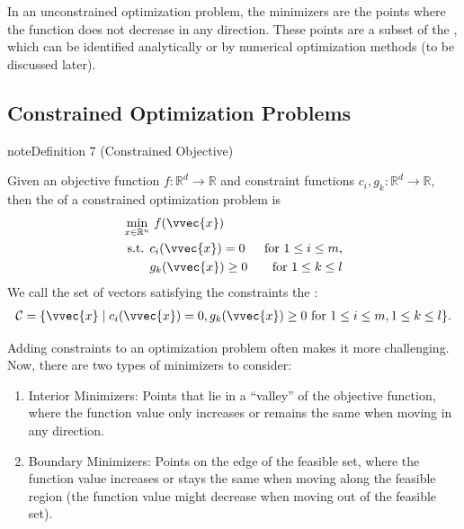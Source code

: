 \documentclass[letterpaper,10pt,english]{jupyterBook}
\begin{document}
\sphinxAtStartPar
In an unconstrained optimization problem, the minimizers are the points where the function does not decrease in any direction. These points are a subset of the , which can be identified analytically or by numerical optimization methods (to be discussed later).


\subsection{Constrained Optimization Problems}
\label{\detokenize{optimization_problems:constrained-optimization-problems}}\label{optimization_problems:constr_objective}
\begin{sphinxadmonition}{note}{Definition 7 (Constrained Objective)}



\sphinxAtStartPar
Given an objective function \(f:\mathbb{R}^d\rightarrow \mathbb{R}\) and constraint functions \(c_i,g_k:\mathbb{R}^d\rightarrow \mathbb{R}\), then  the  of a constrained optimization problem is
\begin{align*}
    \min_{x\in\mathbb{R}^n}&\ f(\vvec{x}) \\
    \text{s.t. }& c_i(\vvec{x}) =0  &\text{ for } 1\leq i \leq m,\\
                & g_k(\vvec{x})\geq 0 &\text{ for }1\leq k\leq l
\end{align*}
\sphinxAtStartPar
We call the set of vectors satisfying the constraints the :
\begin{equation*}
\begin{split}\mathcal{C}=\{\vvec{x}\mid c_i(\vvec{x})=0, g_k(\vvec{x})\geq 0 \text{ for }1\leq i\leq m, 1\leq k\leq l\}.\end{split}
\end{equation*}
\end{sphinxadmonition}

\sphinxAtStartPar
Adding constraints to an optimization problem often makes it more challenging. Now, there are two types of minimizers to consider:
\begin{enumerate}
%
\item {} 
\sphinxAtStartPar
Interior Minimizers: Points that lie in a “valley” of the objective function, where the function value only increases or remains the same when moving in any direction.

\item {} 
\sphinxAtStartPar
Boundary Minimizers: Points on the edge of the feasible set, where the function value increases or stays the same when moving  along the feasible region (the function value might decrease when moving out of the feasible set).

\end{enumerate}
\end{document}
